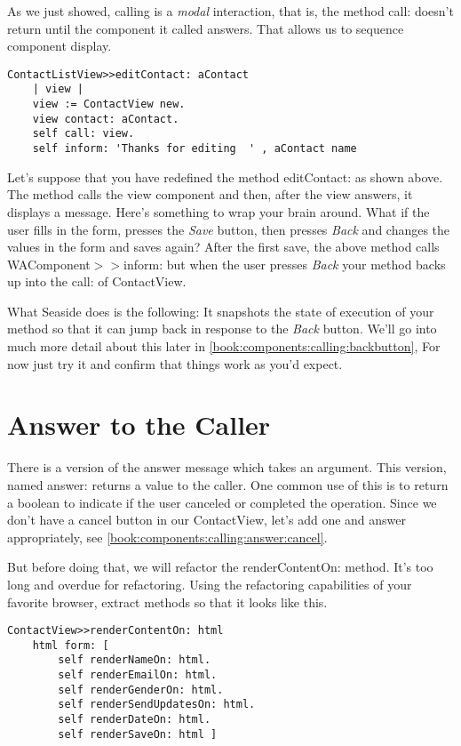 \documentclass[a4paper,10pt,twoside]{book}
\newcommand{\ct}[1]{{\small\ttfamily\textup{#1}}}
\begin{document}
As we just showed, calling is a \textit{modal} interaction, that is, the method \ct{call:} doesn't return until the component it called answers. That allows us to sequence component display.

\begin{lstlisting}
ContactListView>>editContact: aContact
    | view |
    view := ContactView new.
    view contact: aContact.
    self call: view.
    self inform: 'Thanks for editing  ' , aContact name
\end{lstlisting}

Let's suppose that you have redefined the method \ct{editContact:} as shown above. The method calls the view component and then, after the view answers, it displays a message. Here's something to wrap your brain around. What if the user fills in the form, presses the \textit{Save} button, then presses \textit{Back} and changes the values in the form and saves again? After the first save, the above method calls  \ct{WAComponent$>$$>$inform:} but when the user presses \textit{Back} your method backs up into the \ct{call:} of \ct{ContactView}. 

 What Seaside does is the following: It snapshots the state of execution of your method so that it can jump back in response to the \textit{Back} button. We'll go into much more detail about this later in \autoref{book:components:calling:backbutton}, For now just try it and confirm that things work as you'd expect.

\section{Answer to the Caller}
\label{book:components:calling:answer}

There is a version of the \ct{answer} message which takes an argument. This version, named \ct{answer:} returns a value to the caller. One common use of this is to return a boolean to indicate if the user canceled or completed the operation. Since we don't have a cancel button in our \ct{ContactView}, let's add one and answer appropriately, see \autoref{book:components:calling:answer:cancel}.

But before doing that, we will refactor the \ct{renderContentOn:} method. It's too long and overdue for refactoring. Using the refactoring capabilities of your favorite browser, extract methods so that it looks like this.

\begin{lstlisting}
ContactView>>renderContentOn: html
    html form: [
        self renderNameOn: html.
        self renderEmailOn: html.
        self renderGenderOn: html.
        self renderSendUpdatesOn: html.
        self renderDateOn: html.
        self renderSaveOn: html ]
\end{lstlisting}
\end{document}
